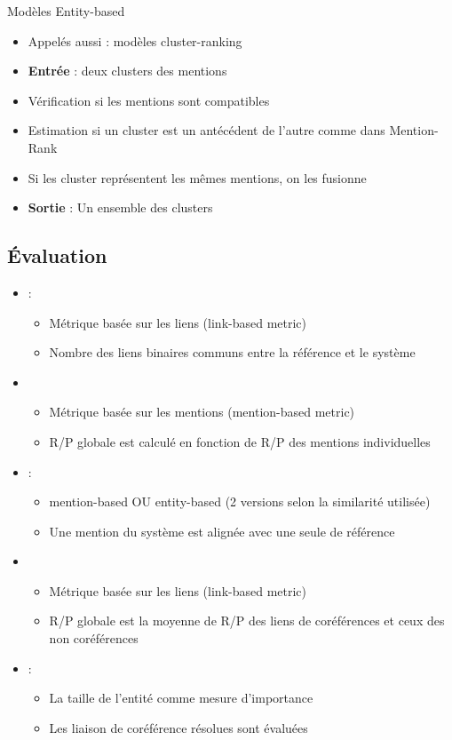 \documentclass{KodeBook}
\begin{document}
Modèles Entity-based
\begin{itemize}
	\item Appelés aussi : modèles cluster-ranking
	\item \textbf{Entrée} : deux clusters des mentions
	\item Vérification si les mentions sont compatibles
	\item Estimation si un cluster est un antécédent de l'autre comme dans Mention-Rank
	\item Si les cluster représentent les mêmes mentions, on les fusionne
	\item \textbf{Sortie} : Un ensemble des clusters
\end{itemize}

\subsection{Évaluation}

\begin{itemize}
	\item {} : 
	\begin{itemize}
		\item Métrique basée sur les liens (link-based metric)
		\item Nombre des liens binaires communs entre la référence et le système
	\end{itemize}
	\item {}
	\begin{itemize}
		\item Métrique basée sur les mentions (mention-based metric)
		\item R/P globale est calculé en fonction de R/P des mentions individuelles
	\end{itemize}
	\item {} : 
	\begin{itemize}
		\item mention-based OU entity-based (2 versions selon la similarité utilisée)
		\item Une mention du système est alignée avec une seule de référence
	\end{itemize}
	\item {} 
	\begin{itemize}
		\item Métrique basée sur les liens (link-based metric)
		\item R/P globale est la moyenne de R/P des liens de coréférences et ceux des non coréférences
	\end{itemize}
	\item {} : 
	\begin{itemize}
		\item La taille de l'entité comme mesure d'importance
		\item Les liaison de coréférence résolues sont évaluées
	\end{itemize}
\end{itemize}
\end{document}

